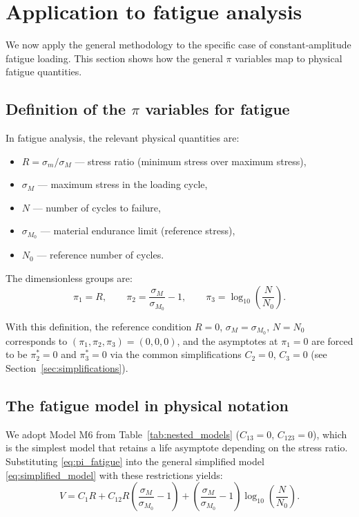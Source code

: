 \section{Application to fatigue analysis}
\label{sec:fatigue-application}

We now apply the general methodology to the specific case of constant‑amplitude fatigue loading. This section shows how the general \(\pi\) variables map to physical fatigue quantities.

\subsection{Definition of the \(\pi\) variables for fatigue}

In fatigue analysis, the relevant physical quantities are:
\begin{itemize}
    \item \(R = \sigma_m/\sigma_M\) — stress ratio (minimum stress over maximum stress),
    \item \(\sigma_M\) — maximum stress in the loading cycle,
    \item \(N\) — number of cycles to failure,
    \item \(\sigma_{M_0}\) — material endurance limit (reference stress),
    \item \(N_0\) — reference number of cycles.
\end{itemize}

The dimensionless groups are:
\begin{equation}\label{eq:pi_fatigue}
\boxed{\pi_1 = R,\qquad \pi_2 = \frac{\sigma_M}{\sigma_{M_0}} - 1,\qquad \pi_3 = \log_{10}\left(\frac{N}{N_0}\right).}
\end{equation}

With this definition, the reference condition \(R=0\), \(\sigma_M = \sigma_{M_0}\), \(N=N_0\) corresponds to \((\pi_1,\pi_2,\pi_3)=(0,0,0)\), and the asymptotes at \(\pi_1=0\) are forced to be \(\pi_2^*=0\) and \(\pi_3^*=0\) via the common simplifications \(C_2=0\), \(C_3=0\) (see Section~\ref{sec:simplifications}).

\subsection{The fatigue model in physical notation}

We adopt Model M6 from Table~\ref{tab:nested_models} (\(C_{13}=0\), \(C_{123}=0\)), which is the simplest model that retains a life asymptote depending on the stress ratio. Substituting \eqref{eq:pi_fatigue} into the general simplified model \eqref{eq:simplified_model} with these restrictions yields:
\begin{equation}\label{eq:fatigue_model}
\boxed{
V = C_1 R + C_{12} R\left(\frac{\sigma_M}{\sigma_{M_0}}-1\right) + \left(\frac{\sigma_M}{\sigma_{M_0}}-1\right)\log_{10}\left(\frac{N}{N_0}\right).
}
\end{equation}

